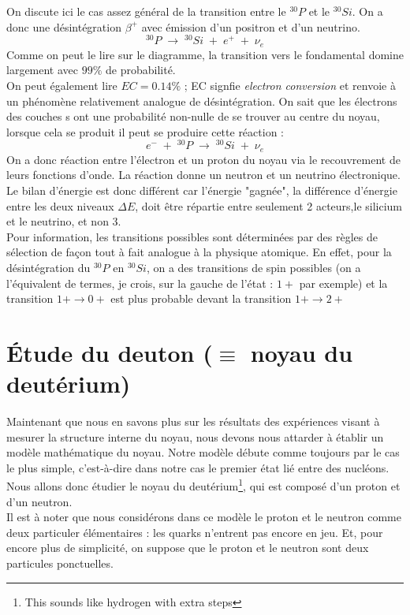 On discute ici le cas assez général de la transition entre le $^{30}P$ et le $^{30}Si$. On a donc une désintégration $\beta^+$ avec émission d'un positron et d'un neutrino.
\begin{equation*}
    ^{30}P \; \longrightarrow \; ^{30}Si \; + \; e^+ \; + \; \nu_e
\end{equation*}
Comme on peut le lire sur le diagramme, la transition vers le fondamental domine largement avec $99\%$ de probabilité.\\
On peut également lire $EC = 0.14\%$ ; EC signfie \emph{electron conversion} et renvoie à un phénomène relativement analogue de désintégration. On sait que les électrons des couches s ont une probabilité non-nulle de se trouver au centre du noyau, lorsque cela se produit il peut se produire cette réaction :
\begin{equation*}
    e^- \; + \; ^{30}P \; \longrightarrow \; ^{30}Si \; + \; \nu_e
\end{equation*}
On a donc réaction entre l'électron et un proton du noyau via le recouvrement de leurs fonctions d'onde. La réaction donne un neutron et un neutrino électronique. Le bilan d'énergie est donc différent car l'énergie "gagnée", la différence d'énergie entre les deux niveaux $\Delta E$, doit être répartie entre seulement 2 acteurs,le silicium et le neutrino, et non 3.\\
Pour information, les transitions possibles sont déterminées par des règles de sélection de façon tout à fait analogue à la physique atomique. En effet, pour la désintégration du $^{30}P$ en $^{30}Si$, on a des transitions de spin possibles (on a l'équivalent de termes, je crois, sur la gauche de l'état : $1+$ par exemple) et la transition $1+ \rightarrow 0+$ est plus probable devant la transition $1+ \rightarrow 2+$















\section{Étude du deuton ($\equiv$ noyau du deutérium)}

Maintenant que nous en savons plus sur les résultats des expériences visant à mesurer la structure interne du noyau, nous devons nous attarder à établir un modèle mathématique du noyau. Notre modèle débute comme toujours par le cas le plus simple, c'est-à-dire dans notre cas le premier état lié entre des nucléons. Nous allons donc étudier le noyau du deutérium\footnote{This sounds like hydrogen with extra steps}, qui est composé d'un proton et d'un neutron.\\
Il est à noter que nous considérons dans ce modèle le proton et le neutron comme deux particuler élémentaires : les quarks n'entrent pas encore en jeu. Et, pour encore plus de simplicité, on suppose que le proton et le neutron sont deux particules ponctuelles.\\


